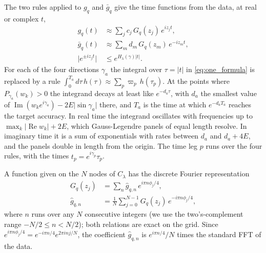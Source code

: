 \documentclass[aps,prb,reprint,a4paper]{revtex4-2}
\DeclareMathOperator{\Imag}{Im}
\DeclareMathOperator{\Real}{Re}
\begin{document}
The two rules applied to $g_q$ and $\bar g_q$ give the time functions from the data, at real or complex $t$,
\begin{equation}
  \begin{aligned}
  g_q(t)&\approx\sum_jc_j\,G_q(z_j)\,e^{iz_jt},\\
  \bar g_q(t)&\approx\sum_md_m\,G_q(z_m)\,e^{-iz_mt},\\
  \lvert e^{\pm iz_jt}\rvert&\le e^{H_\lambda(\gamma)\lvert t\rvert}.
  \end{aligned}
  \label{eq:gt_nodes}
\end{equation}
For each of the four directions $\gamma_a$ the integral over $\tau=\lvert t\rvert$ in \eqref{eq:one_formula} is replaced by a rule $\int_0^{T_a}d\tau\,h(\tau)\approx\sum_p\varpi_p\,h(\tau_p)$. At the points where $P_{\gamma_a}(w_k)>0$ the integrand decays at least like $e^{-d_a\tau}$, with $d_a$ the smallest value of $\Imag(w_ke^{i\gamma_a})-2E\lvert\sin\gamma_a\rvert$ there, and $T_a$ is the time at which $e^{-d_aT_a}$ reaches the target accuracy. In real time the integrand oscillates with frequencies up to $\max_k\lvert\Real w_k\rvert+2E$, which Gauss-Legendre panels of equal length resolve. In imaginary time it is a sum of exponentials with rates between $d_a$ and $d_a+4E$, and the panels double in length from the origin. The time leg $p$ runs over the four rules, with the times $t_p=e^{i\gamma_p}\tau_p$.

A function given on the $N$ nodes of $C_\lambda$ has the discrete Fourier representation
\begin{equation}
  \begin{aligned}
  G_q(z_j)&=\sum_{n}\hat g_{q,n}\,e^{i\pi n\phi_j/4},\\
  \hat g_{q,n}&=\frac1N\sum_{j=0}^{N-1}G_q(z_j)\,e^{-i\pi n\phi_j/4},
  \end{aligned}
  \label{eq:ghat}
\end{equation}
where $n$ runs over any $N$ consecutive integers (we use the two's-complement range $-N/2\le n<N/2$); both relations are exact on the grid. Since $e^{i\pi n\phi_j/4}=e^{-i\pi n/4}e^{2\pi inj/N}$, the coefficient $\hat g_{q,n}$ is $e^{i\pi n/4}/N$ times the standard FFT of the data.
\end{document}
